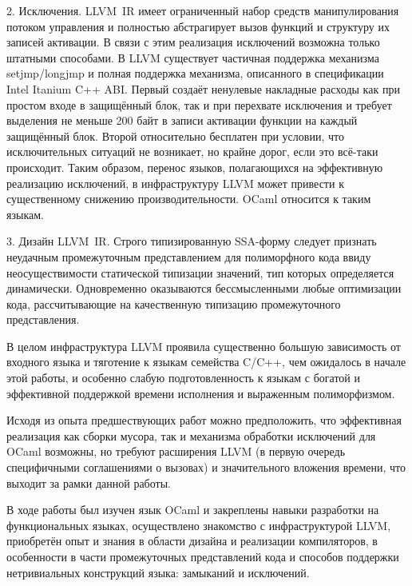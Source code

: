 \documentclass[a4paper, 12pt]{article}
\begin{document}
2. Исключения. LLVM~IR имеет ограниченный набор средств манипулирования потоком управления и полностью абстрагирует
вызов функций и структуру их записей активации. В связи с этим реализация исключений возможна только штатными способами.
В LLVM существует частичная поддержка механизма setjmp/longjmp и полная поддержка механизма, описанного в спецификации
Intel Itanium C++ ABI. Первый создаёт ненулевые накладные расходы как при простом входе в защищённый блок, так и при
перехвате исключения и требует выделения не меньше 200 байт в записи активации функции на каждый защищённый блок. Второй
относительно бесплатен при условии, что исключительных ситуаций не возникает, но крайне дорог, если это всё-таки
происходит. Таким образом, перенос языков, полагающихся на эффективную реализацию исключений, в инфраструктуру LLVM
может привести к существенному снижению производительности. OCaml относится к таким языкам.

3. Дизайн LLVM~IR. Строго типизированную SSA-форму следует признать неудачным промежуточным представлением
для полиморфного кода ввиду неосуществимости статической типизации значений, тип которых определяется динамически.
Одновременно оказываются бессмысленными любые оптимизации кода, рассчитывающие на качественную типизацию промежуточного
представления.

В целом инфраструктура LLVM проявила существенно большую зависимость от входного языка и тяготение к языкам
семейства C/C++, чем ожидалось в начале этой работы, и особенно слабую подготовленность к языкам с богатой и эффективной
поддержкой времени исполнения и выраженным полиморфизмом.

Исходя из опыта предшествующих работ можно предположить, что эффективная реализация как сборки мусора, так и
механизма обработки исключений для OCaml возможны, но требуют расширения LLVM (в первую очередь специфичными
соглашениями о вызовах) и значительного вложения времени, что выходит за рамки данной работы.

В ходе работы был изучен язык OCaml и закреплены навыки разработки на функциональных языках, осуществлено знакомство с
инфраструктурой LLVM, приобретён опыт и знания в области дизайна и реализации компиляторов, в особенности в части
промежуточных представлений кода и способов поддержки нетривиальных конструкций языка: замыканий и исключений.
\end{document}
